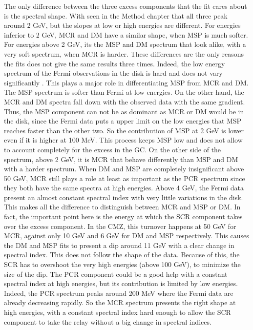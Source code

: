 The only difference between the three excess components that the fit cares about is the spectral shape. With seen in the Method chapter that all three peak around 2 GeV, but the slopes at low or high energies are different. For energies inferior to 2 GeV, MCR and DM have a similar shape, when MSP is much softer. For energies above 2 GeV, its the MSP and DM spectrum that look alike, with a very soft spectrum, when MCR is harder.
These differences are the only reasons the fits does not give the same results three times.
Indeed, the low energy spectrum of the Fermi observations in the disk is hard and does not vary significantly . This plays a major role in differentiating MSP from MCR and DM. The MSP spectrum is softer than Fermi at low energies. On the other hand, the MCR and DM spectra fall down with the observed data with the same gradient. Thus, the MSP component can not be as dominant as MCR or DM would be in the disk, since the Fermi data puts a upper limit on the low energies that MSP reaches faster than the other two. So the contribution of MSP at 2 GeV is lower even if it is higher at 100 MeV. This process keeps MSP low and does not allow to account completely for the excess in the GC.
On the other side of the spectrum, above 2 GeV, it is MCR that behave differently than MSP and DM with a harder spectrum. When DM and MSP are completely insignificant above 50 GeV, MCR still plays a role at least as important as the PCR spectrum since they both have the same spectra at high energies. Above 4 GeV, the Fermi data present an almost constant spectral index with very little variations in the disk. This makes all the difference to distinguish between MCR and MSP or DM. In fact, the important point here is the energy at which the SCR component takes over the excess component. In the CMZ, this turnover happens at 50 GeV for MCR, against only 10 GeV and 6 GeV for DM and MSP respectively. This causes the DM and MSP fits to present a dip around 11 GeV with a clear change in spectral index. This does not follow the shape of the data. Because of this, the SCR has to overshoot the very high energies (above 100 GeV), to minimize the size of the dip. The PCR component could be a good help with a constant spectral index at high energies, but its contribution is limited by low energies. Indeed, the PCR spectrum peaks around 200 MeV where the Fermi data are already decreasing rapidly. So the MCR spectrum presents the right shape at high energies, with a constant spectral index hard enough to allow the SCR component to take the relay without a big change in spectral indices.

